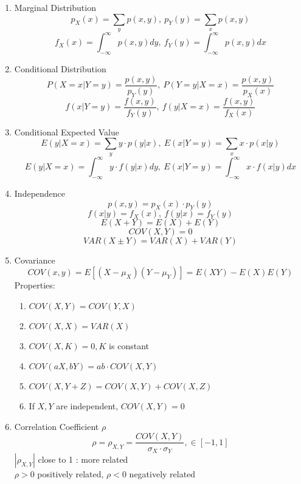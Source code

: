 \documentclass[10pt]{article}
\begin{document}
\begin{multicols}{2}
\begin{enumerate}
			\begin{enumerate}
				\item Marginal Distribution
				$$p_X(x)=\sum_{y}p(x,y), \ p_Y(y)=\sum_{x}p(x,y) $$
				$$f_X(x) = \int_{-\infty}^{\infty}p(x,y)dy, \ f_Y(y) = \int_{-\infty}^{\infty}p(x,y)dx$$
				\item Conditional Distribution
				$$P(X = x|Y = y) = \frac{p(x,y)}{p_Y(y)}, \ P(Y = y|X = x) = \frac{p(x,y)}{p_X(x)}$$
				$$f(x|Y=y)=\frac{f(x,y)}{f_Y(y)}, \ f(y|X=x)=\frac{f(x,y)}{f_X(x)}$$
				\item Conditional Expected Value
				$$E(y|X=x) = \sum_{y}y\cdot p(y|x), \ E(x|Y=y) = \sum_{x}x\cdot p(x|y)$$
				$$E(y|X=x) = \int_{-\infty}^{\infty}y\cdot f(y|x)dy, \ E(x|Y=y) = \int_{-\infty}^{\infty}x\cdot f(x|y)dx$$
				\item Independence
				$$p(x,y) = p_X(x) \cdot p_Y(y)$$
				$$f(x|y) = f_X(x), \ f(y|x) = f_Y(y)$$
				$$E(X+Y) = E(X)+E(Y)$$
				$$COV(X,Y) = 0$$
				$$VAR(X \pm Y) = VAR(X) + VAR(Y)$$
				\item Covariance
				$$COV(x,y) = E[(X-\mu_X)(Y-\mu_Y)] = E(XY) - E(X)E(Y)$$
				Properties:
				\begin{enumerate}
					\item $COV(X,Y) = COV(Y,X)$
					\item $COV(X,X) = VAR(X)$
					\item $COV(X,K) = 0, K$ is constant
					\item $COV(aX,bY) = ab\cdot COV(X,Y)$
					\item $COV(X,Y+Z) = COV(X,Y) + COV(X,Z)$
					\item If $X, Y$ are independent, $COV(X,Y) = 0$
				\end{enumerate}
				\item Correlation Coefficient $\rho$\\
				$$\rho = \rho_{X,Y}= \frac{COV(X,Y)}{\sigma_X \cdot \sigma_Y}, \in [-1,1]$$
				$|\rho_{X,Y}|$ close to 1 : more related\\
				$\rho > 0$ positively related, $\rho < 0$ negatively related
			\end{enumerate}
		\end{enumerate}
	\newpage
	\end{multicols}
\end{document}
